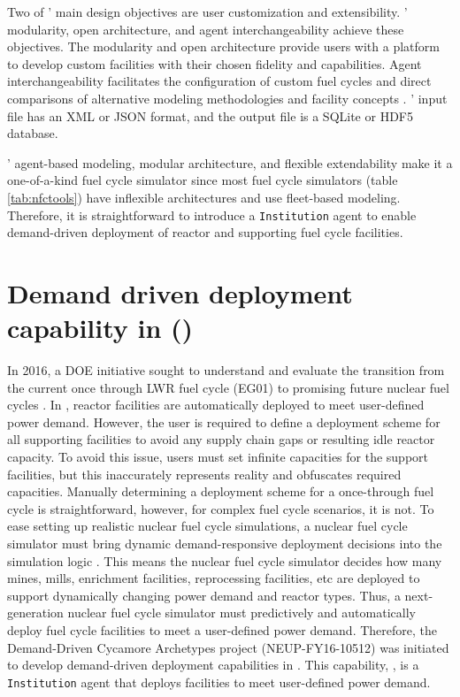 Two of \Cyclus' main design objectives are user customization and 
extensibility. 
\Cyclus' modularity, open architecture, and agent interchangeability 
achieve these objectives.
The modularity and open architecture provide users with a 
platform to develop custom facilities with their chosen fidelity 
and capabilities. 
Agent interchangeability facilitates the configuration of custom fuel 
cycles and direct comparisons of alternative modeling methodologies 
and facility concepts \cite{huff_fundamental_2016}. 
\Cyclus' input file has an XML or JSON format, and the output file is 
a SQLite or HDF5 database. 

\Cyclus' agent-based modeling, modular architecture, and flexible extendability make 
it a one-of-a-kind fuel cycle simulator since most fuel cycle simulators (table \ref{tab:nfctools})
have inflexible architectures and use fleet-based modeling. 
Therefore, it is straightforward to introduce a \Cyclus \texttt{Institution}
agent to enable demand-driven deployment of reactor and supporting fuel cycle facilities.

\section{Demand driven deployment capability in \Cyclus (\deploy)}
In 2016, a DOE initiative sought to understand and evaluate the 
transition from the current once through LWR fuel cycle (EG01) 
to promising future nuclear fuel cycles \cite{feng_standardized_2016}.
In \Cyclus, reactor facilities are automatically 
deployed to meet user-defined power demand. 
However, the user is required to define a deployment scheme for all 
supporting facilities to avoid any supply chain 
gaps or resulting idle reactor capacity. 
To avoid this issue, users 
must set infinite capacities for the support facilities, 
but this inaccurately represents reality and obfuscates 
required capacities. 
Manually determining a deployment scheme for a once-through 
fuel cycle is straightforward, however, for complex fuel cycle 
scenarios, it is not.   
To ease setting up realistic nuclear fuel cycle simulations, a nuclear fuel cycle simulator
must bring dynamic demand-responsive deployment decisions into 
the simulation logic \cite{huff_current_2017}. 
This means the nuclear fuel cycle simulator decides how many mines, 
mills, enrichment facilities,
reprocessing facilities, etc are deployed to support dynamically 
changing power demand and reactor types.  
Thus, a next-generation nuclear fuel cycle simulator must predictively and 
automatically deploy fuel cycle facilities to meet a user-defined 
power demand. 
Therefore, the Demand-Driven Cycamore Archetypes project
(NEUP-FY16-10512) was initiated to develop demand-driven deployment 
capabilities in \Cyclus.
This capability, \deploy, is a \Cyclus \texttt{Institution}
agent that deploys facilities to meet user-defined power demand. 

